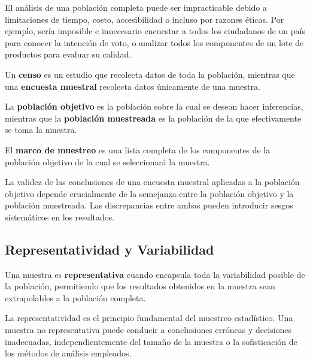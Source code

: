 \begin{remark}
El análisis de una población completa puede ser impracticable debido a limitaciones de tiempo, costo, accesibilidad o incluso por razones éticas. Por ejemplo, sería imposible e innecesario encuestar a todos los ciudadanos de un país para conocer la intención de voto, o analizar todos los componentes de un lote de productos para evaluar su calidad.
\end{remark}

\begin{definition}
Un \textbf{censo} es un estudio que recolecta datos de toda la población, mientras que una \textbf{encuesta muestral} recolecta datos únicamente de una muestra.
\end{definition}

\begin{definition}
La \textbf{población objetivo} es la población sobre la cual se desean hacer inferencias, mientras que la \textbf{población muestreada} es la población de la que efectivamente se toma la muestra.
\end{definition}

\begin{definition}
El \textbf{marco de muestreo} es una lista completa de los componentes de la población objetivo de la cual se seleccionará la muestra.
\end{definition}

\begin{remark}
La validez de las conclusiones de una encuesta muestral aplicadas a la población objetivo depende crucialmente de la semejanza entre la población objetivo y la población muestreada. Las discrepancias entre ambas pueden introducir sesgos sistemáticos en los resultados.
\end{remark}

\subsection{Representatividad y Variabilidad}

\begin{definition}
Una muestra es \textbf{representativa} cuando encapsula toda la variabilidad posible de la población, permitiendo que los resultados obtenidos en la muestra sean extrapolables a la población completa.
\end{definition}

\begin{remark}
La representatividad es el principio fundamental del muestreo estadístico. Una muestra no representativa puede conducir a conclusiones erróneas y decisiones inadecuadas, independientemente del tamaño de la muestra o la sofisticación de los métodos de análisis empleados.
\end{remark}

